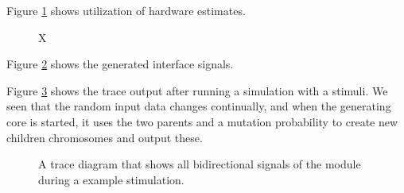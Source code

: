 Figure \ref{fig:ggutilizationestimates} shows utilization of hardware estimates.

\begin{figure}[htbp]
	\centering
	\caption{X}
	\label{fig:ggutilizationestimates}
\end{figure}

Figure \ref{fig:gginterface} shows the generated interface signals.

\begin{figure}[htbp]
	\centering
	\caption{}
	\label{fig:gginterface}
\end{figure}

Figure \ref{fig:generationgeneratortrace} shows the trace output after running a simulation with a stimuli. We seen that the random input data changes continually, and when the generating core is started, it uses the two parents and a mutation probability to create new children chromosomes and output these.

\begin{figure}[htbp]
	\centering
	\caption{A trace diagram that shows all bidirectional signals of the module during a example stimulation.}
	\label{fig:generationgeneratortrace}
\end{figure}

